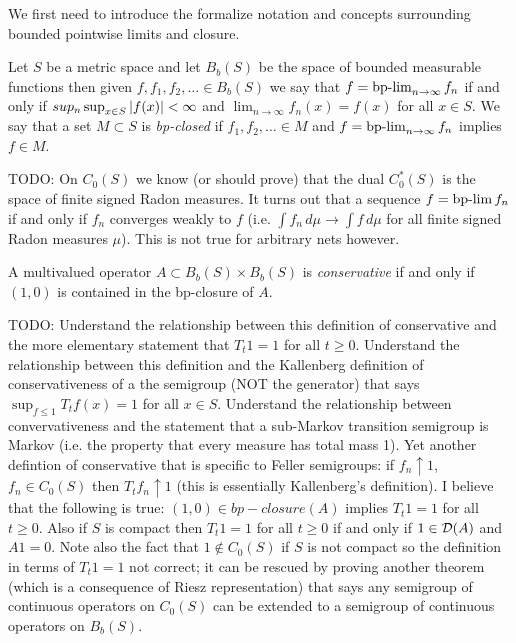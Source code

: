 We first need to introduce the formalize notation and concepts surrounding bounded pointwise limits and closure.

\begin{defn}Let $S$ be a metric space and let $B_b(S)$ be the space of bounded measurable functions then given $f, f_1, f_2, \dotsc \in B_b(S)$ we say that $f = \operatorname*{bp-lim}_{n \to \infty} f_n$ if and only if $sup_n \sup_{x \in S} \left \vert f(x) \right \vert < \infty$ and $\lim_{n \to \infty} f_n(x) = f(x)$ for all $x \in S$.  We say that a set $M \subset S$ is \emph{bp-closed} if $f_1, f_2, \dotsc \in M$ and $f = \operatorname*{bp-lim}_{n \to \infty} f_n$ implies $f \in M$.  
\end{defn}

TODO:  On $C_0(S)$ we know (or should prove) that the dual $C^*_0(S)$ is the space of finite signed Radon measures.  It turns out that a sequence $f = \operatorname*{bp-lim} f_n$ if and only if $f_n$ converges weakly to $f$ (i.e. $\int f_n \, d \mu \to \int f  \, d\mu$ for all finite signed Radon measures $\mu$).  This is not true for arbitrary nets however.

\begin{defn}A multivalued operator $A \subset B_b(S) \times B_b(S)$ is \emph{conservative} if and only if $(1,0)$ is contained in the bp-closure of $A$.
\end{defn}

TODO: Understand the relationship between this definition of conservative and the more elementary statement that $T_t 1 = 1$ for all $t \geq 0$.  Understand the relationship between this definition and the Kallenberg definition of conservativeness of a the semigroup (NOT the generator) that says $\sup_{f \leq 1} T_t f (x) = 1$ for all $x \in S$.  Understand the relationship between convervativeness and the statement that a sub-Markov transition semigroup is Markov (i.e. the property that every measure has total mass 1).  Yet another defintion of conservative that is specific to Feller semigroups: if $f_n \uparrow 1$, $f_n \in C_0(S)$ then $T_t f_n \uparrow 1$ (this is essentially Kallenberg's definition).  I believe that the following is true: $(1,0) \in bp-closure(A)$ implies $T_t 1 = 1$ for all $t \geq 0$.  Also if $S$ is compact then $T_t 1 = 1$ for all $t \geq 0$ if and only if $1 \in \mathcal{D}(A)$ and $A 1 = 0$.  Note also the fact that $1 \notin C_0(S)$ if $S$ is not compact so the definition in terms of $T_t 1 = 1$ not correct; it can be rescued by proving another theorem (which is a consequence of Riesz representation) that says any semigroup of continuous operators on $C_0(S)$ can be extended to a semigroup of continuous operators on $B_b(S)$.

